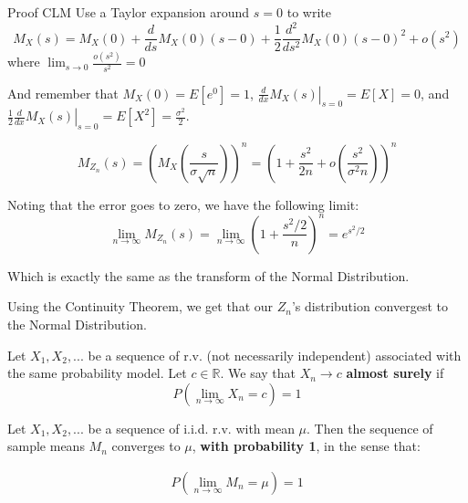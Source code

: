 \documentclass[aspectratio=169]{beamer}
\begin{document}
\begin{frame}{Proof CLM}
    Use a Taylor expansion around $s=0$ to write $$M_X(s)=M_X(0)+\frac{d}{ds}M_X(0)(s-0)+\frac{1}{2}\frac{d^2}{ds^2}M_X(0)(s-0)^2+o(s^2)$$ where $\lim_{s\rightarrow 0}\frac{o(s^2)}{s^2}=0$
    
    And remember that $M_X(0)=E[e^{0}]=1$, $\left.\frac{d}{dx}M_X(s)\right|_{s=0}=E[X]=0$, and $\left.\frac{1}{2}\frac{d}{dx}M_X(s)\right|_{s=0}=E[X^2]=\frac{\sigma^2}{2}$.

    \[M_{Z_n}(s)=\left(M_X\left(\frac{s}{\sigma\sqrt{n}}\right)\right)^n=\left(1+\frac{s^2}{2n}+o\left(\frac{s^2}{\sigma^2n}\right)\right)^n\]
\end{frame}

\begin{frame}
    Noting that the error goes to zero, we have the following limit:
    \[\lim_{n\rightarrow\infty} M_{Z_n}(s)=\lim_{n\rightarrow\infty} \left(1+\frac{s^2/2}{n}\right)^n=e^{s^2/2}\]

    Which is exactly the same as the transform of the Normal Distribution.

    \vspace{1em}

    Using the Continuity Theorem, we get that our $Z_n$'s distribution convergest to the Normal Distribution.
\end{frame}

\begin{frame}
    \begin{definition}
        Let $X_1,X_2,...$ be a sequence of r.v. (not necessarily independent) associated with the same probability model. Let $c\in\mathbb{R}$. We say that $X_n\rightarrow c$ \textbf{almost surely} if
        $$P\left(\lim_{n\rightarrow \infty} X_n=c\right)=1$$
    \end{definition}
\end{frame}

\begin{frame}
    \begin{theorem}
        Let $X_1,X_2,...$ be a sequence of i.i.d. r.v. with mean $\mu$. Then the sequence of sample means $M_n$ converges to $\mu$, \textbf{with probability 1}, in the sense that:
        
        \begin{align*}
            P\left(\lim_{n\rightarrow\infty}M_n=\mu\right)=1
        \end{align*}
    \end{theorem}
\end{frame}
\end{document}
